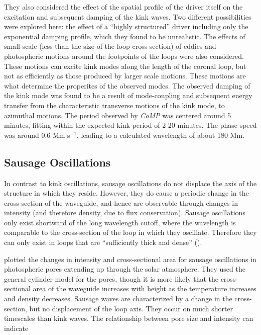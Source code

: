 \documentclass[preprint2]{aastex}
\begin{document}
They also considered the effect of the spatial profile of the driver
itself on the excitation and subsequent damping of the kink
waves. Two different possibilities were explored here:
the effect of a ``highly structured'' driver including only the
exponential damping profile, which they
found to be unrealistic.
The effects of small-scale (less than the size of the loop cross-section)
of eddies and photospheric motions around the footpoints of the loops
were also considered.
These motions can excite kink modes along the length of the coronal
loop, but not as efficiently as those produced by larger scale
motions. These motions are what determine the properites of the
observed modes.
The observed damping of the kink mode was found to be a result
of mode-coupling and subsequent energy transfer from the characteristic
transverse motions of the kink mode, to azimuthal motions.
The period observed by \emph{CoMP} was centered around
5 minutes, fitting within the expected kink period of 2-20 minutes.
The phase speed was around 0.6 Mm s$^{-1}$, leading to a calculated
wavelength of about 180 Mm.

\subsection{Sausage Oscillations}\label{sausage}
In contrast to kink oscillations, sausage oscillations do not displace
the axis of the structure in which they reside. However, they do cause
a periodic change in the cross-section of the waveguide, and hence
are observable through changes in intensity (and therefore density,
due to flux conservation). Sausage oscillations only exist shortward
of the long wavelength cutoff, where the wavelength is comparable to
the cross-section of the loop in which they oscillate. Therefore
they can only exist in loops that are ``sufficiently thick and dense''
(\cite{pfw_2}).

\cite{sausage_1} plotted the changes in intensity and cross-sectional
area for sausage oscillations in photospheric pores extending up
through the solar atmosphere. They used the general cylinder model for
the pores, though it is more likely that the cross-sectional area of
the waveguide increases with height as the temperature increases and
density decreases.
Sausage waves are characterized by a change in the cross-section,
but no displacement of the loop axis. They occur on much shorter
timescales than kink waves.
The relationship between pore size and intensity can
indicate
\end{document}
